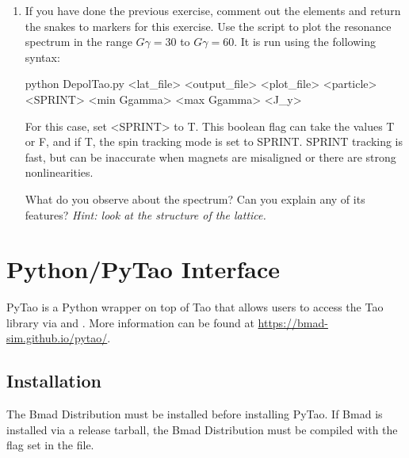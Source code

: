 \documentclass{hitec}     %
\begin{document}
{{{{\begin{enumerate}[leftmargin=*]
Play around with the  command at different energies, and verify that the spin tune is \emph{not} $G\gamma$. Why is this the case?

\item If you have done the previous exercise, comment out the  elements and return the snakes to markers for this exercise. Use the script  to plot the resonance spectrum in the range $G\gamma = 30$ to $G\gamma =60$. It is run using the following syntax:
\begin{code}
python DepolTao.py <lat_file> <output_file> <plot_file> <particle> <SPRINT>
<min Ggamma> <max Ggamma> <J_y>
\end{code}
For this case, set <SPRINT> to T. This boolean flag can take the values T or F, and if T, the spin tracking mode is set to SPRINT. SPRINT tracking is fast, but can be inaccurate when magnets are misaligned or there are strong nonlinearities.

What do you observe about the spectrum? Can you explain any of its features? \emph{Hint: look at the structure of the lattice.}
\end{enumerate}





\newpage

\appendix

\section{Python/PyTao Interface}

PyTao is a Python wrapper on top of Tao that allows users to access the Tao library via  and . More information can be found at \url{https://bmad-sim.github.io/pytao/}.

\subsection{Installation}

The Bmad Distribution must be installed before installing PyTao. If Bmad is installed via a release tarball, the Bmad Distribution must be compiled with the  flag set in the  file. 

}}}}
\end{document}
